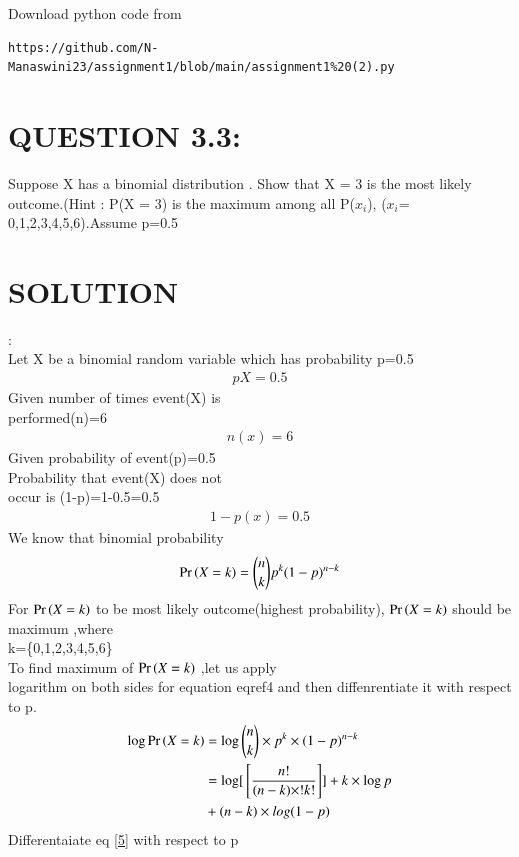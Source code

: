 \documentclass[journal,12pt,twocolumn]{IEEEtran}
\begin{document}
\renewcommand{\thefigure}{\theenumi}
\renewcommand{\thetable}{\theenumi}
Download python code from 
\begin{lstlisting}
https://github.com/N-Manaswini23/assignment1/blob/main/assignment1%20(2).py
\end{lstlisting}
%



\section*{ QUESTION 3.3:}
Suppose X has a binomial
 distribution . Show that X = 3 is the most likely outcome.(Hint : P(X = 3) is the maximum among all P($x_i$), ($x_i$= 0,1,2,3,4,5,6).Assume p=0.5 
 \\
\section*{SOLUTION}:\\
Let X be a binomial random variable which has probability p=0.5\\
 \begin{align}
p{X}=0.5 \label{1}
 \end{align}
Given number of times event(X) is\\
 performed(n)=6\\
 \begin{align}
 n(x)=6 \label{2}
 \end{align}
Given probability of event(p)=0.5\\
Probability that event(X) does not \\occur is
(1-p)=1-0.5=0.5\\
 \begin{align}
1-p(x)=0.5 \label{3}
 \end{align}
We know that binomial probability\\
\begin{align}
\Pr\left(X=k\right)= \binom{n}{k}p^k({1-p})^{n-k}  \label{4} 
\end{align}
For $\Pr\left(X=k\right)$ to be most likely outcome(highest probability),
 $\Pr\left(X=k\right)$  should be maximum ,where\\
 k=\{0,1,2,3,4,5,6\}\\
To find maximum of  $\Pr\left(X=k\right)$  ,let us  apply \\logarithm on both sides for equation eqref{4} and then diffenrentiate it with respect
to p.
\begin{align}
\log  \Pr\left(X=k\right) &=\log \binom{n}{k}\times p^k\times ({1-p})^{n-k} \\
&=\log[{}\left[\frac{n!}{(n-k)\times !k!}\right]]+k \times \log p \notag \\
 &+(n-k)\times log (1-p) \label{5}
\end{align}
Differentaiate eq \eqref{5} with respect to p
\end{document}
